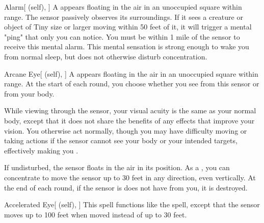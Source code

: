 \lowercase{\hypertarget{spell:Alarm}{}}\label{spell:Alarm}
\begin{attuneability}[\nth{1}]{\hypertarget{spell:Alarm}{Alarm}}[ (self), ]
A  appears floating in the air in an unoccupied square within \rngmed range.
The sensor passively observes its surroundings.
If it sees a creature or object of Tiny size or larger moving within 50 feet of it, it will trigger a mental "ping" that only you can notice.
You must be within 1 mile of the sensor to receive this mental alarm.
This mental sensation is strong enough to wake you from normal sleep, but does not otherwise disturb concentration.
\end{attuneability}
\vspace{0.25em}



\lowercase{\hypertarget{spell:Arcane Eye}{}}\label{spell:Arcane Eye}
\begin{attuneability}[\nth{1}]{\hypertarget{spell:Arcane Eye}{Arcane Eye}}[ (self), ]
A  appears floating in the air in an unoccupied square within \rngmed range.
At the start of each round, you choose whether you see from this sensor or from your body.

While viewing through the sensor, your visual acuity is the same as your normal body, except that it does not share the benefits of any  effects that improve your vision.
You otherwise act normally, though you may have difficulty moving or taking actions if the sensor cannot see your body or your intended targets, effectively making you \blinded.

If undisturbed, the sensor floats in the air in its position.
As a , you can concentrate to move the sensor up to 30 feet in any direction, even vertically.
At the end of each round, if the sensor is does not have  from you, it is destroyed.
\end{attuneability}
\vspace{0.25em}



\lowercase{\hypertarget{spell:Accelerated Eye}{}}\label{spell:Accelerated Eye}
\begin{attuneability}[\nth{2}]{\hypertarget{spell:Accelerated Eye}{Accelerated Eye}}[ (self), ]
This spell functions like the  spell, except that the sensor moves up to 100 feet when moved instead of up to 30 feet.
\end{attuneability}
\vspace{0.25em}



